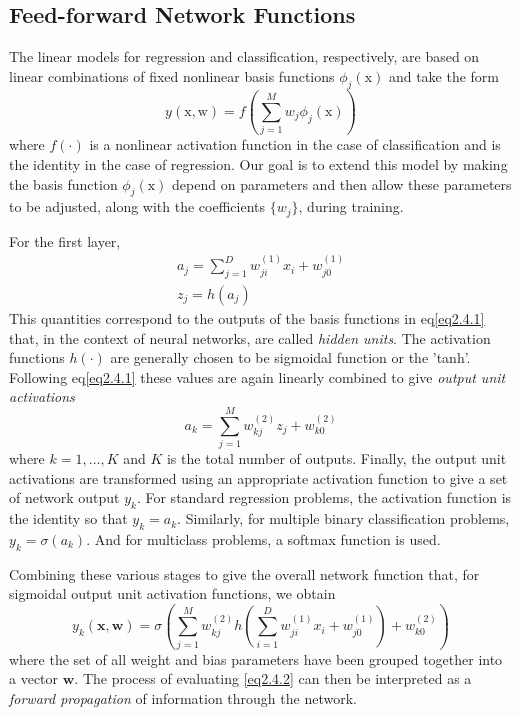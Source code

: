 \documentclass{article}
\newcommand{\mbf}{\mathbf}
\newcommand{\ww}{\mbf w}
\newcommand{\xx}{\mbf x}
\begin{document}
\subsection{Feed-forward Network Functions}
The linear models for regression and classification, respectively, are based on linear combinations of fixed nonlinear basis functions $\phi_j(\mathrm x)$ and take the form
\begin{equation}\label{eq2.4.1}
  y(\mathrm x,\mathrm w) = f(\sum_{j=1}^Mw_j\phi_j(\mathrm x))
\end{equation}
where $f(\cdot)$ is a nonlinear activation function in the case of classification and is the identity in the case of regression. Our goal is to extend this model by making the basis function $\phi_j(\mathrm x)$ depend on parameters and then allow these parameters to be adjusted, along with the coefficients $\{w_j\}$, during training.

For the first layer,
\begin{gather}\label{}
a_j=\sum_{j=1}^Dw_{ji}^{(1)}x_i+w_{j0}^{(1)} \\
z_j=h(a_j)
\end{gather}
This quantities correspond to the outputs of the basis functions in eq\ref{eq2.4.1} that, in the context of neural networks, are called \textit{hidden units}. The activation functions $h(\cdot)$  are generally chosen to be sigmoidal function or the 'tanh'. Following eq\ref{eq2.4.1} these values are again linearly combined to give \textit{output unit activations}
\begin{equation}\label{}
  a_k=\sum_{j=1}^{M}w_{kj}^{(2)}z_j+w_{k0}^{(2)}
\end{equation}
where $k=1,\dots,K$ and $K$ is the total number of outputs. Finally, the output unit activations are transformed using an appropriate activation function to give a set of network output $y_k$. For standard regression problems, the activation function is the identity so that $y_k=a_k$. Similarly, for multiple binary classification problems, $y_k =\sigma(a_k)$. And for multiclass problems, a softmax function is used.

Combining these various stages to give the overall network function that, for sigmoidal output unit activation functions, we obtain
\begin{equation}\label{eq2.4.2}
  y_k(\xx,\ww) = \sigma(\sum_{j=1}^{M}w_{kj}^{(2)}h(\sum_{i=1}^{D}w_{ji}^{(1)}x_i+w_{j0}^{(1)})+w_{k0}^{(2)})
\end{equation}
where the set of all weight and bias parameters have been grouped together into a vector $\ww$. The process of evaluating \ref{eq2.4.2} can then be interpreted as a \textit{forward propagation} of information through the network.
\end{document}
